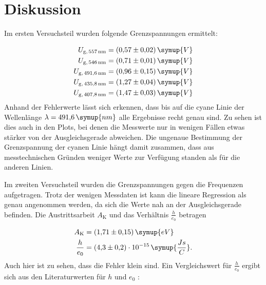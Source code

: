 \section{Diskussion}

Im ersten Versuchsteil wurden folgende Grenzspannungen ermittelt:

\begin{equation*}
\begin{aligned}
U_{\text{g,\,557\,nm}} &= (0{,}57 \pm 0{,}02)\,\symup{V} \\
U_{\text{g,\,546\,nm}} &= (0{,}71 \pm 0{,}01)\,\symup{V} \\
U_{\text{g,\,491,6\,nm}} &= (0{,}96 \pm 0{,}15)\,\symup{V} \\
U_{\text{g,\,435,8\,nm}} &= (1{,}27 \pm 0{,}04)\,\symup{V} \\
U_{\text{g,\,407,8\,nm}} &= (1{,}47 \pm 0{,}03)\,\symup{V} \\
\end{aligned}
\end{equation*}
Anhand der Fehlerwerte lässt sich erkennen, dass bis auf die cyane Linie der Wellenlänge $\lambda = 491{,}6\,\symup{nm}$ alle Ergebnisse recht genau sind. Zu sehen ist dies auch in den Plots, bei denen die Messwerte nur in wenigen Fällen etwas stärker von der Ausgleichsgerade abweichen. Die ungenaue 
Bestimmung der Grenzspannung der cyanen Linie hängt damit zusammen, dass aus messtechnischen Gründen weniger Werte zur Verfügung standen als für die anderen Linien. 

Im zweiten Versuchsteil wurden die Grenzspannungen gegen die Frequenzen aufgetragen. Trotz der wenigen Messdaten ist kann die lineare Regression als genau angenommen werden, da sich die Werte nah an der Ausgleichsgerade befinden. Die Austrittsarbeit 
$A_{\text{K}}$ und das Verhältnis $\frac{h}{e_0}$ betragen

\begin{equation*}
\begin{aligned}
A_{\text{K}} &= (1{,}71 \pm 0{,}15)\, \symup{eV} \\
\frac{h}{e_0} &= (4{,}3 \pm 0{,}2 )\cdot 10^{-15}\, \symup{\frac{Js}{C}}.\\
\end{aligned}
\end{equation*}
Auch hier ist zu sehen, dass die Fehler klein sind. Ein Vergleichswert für $\frac{h}{e_0}$ ergibt sich aus den Literaturwerten für $h$ und $e_0$ \cite{naturkonstanten}:

